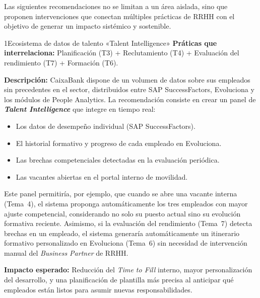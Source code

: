 Las siguientes recomendaciones no se limitan a un área aislada, sino que
proponen intervenciones que conectan múltiples prácticas de RRHH con el
objetivo de generar un impacto sistémico y sostenible.

\begin{recomendacion}{1}{Ecosistema de datos de talento «Talent Intelligence»}
\textbf{Práticas que interrelaciona:} Planificación (T3) + Reclutamiento (T4) + Evaluación del
rendimiento (T7) + Formación (T6).

\medskip
\textbf{Descripción:}
CaixaBank dispone de un volumen de datos sobre sus empleados sin precedentes
en el sector, distribuidos entre SAP SuccessFactors, Evoluciona y los módulos
de People Analytics. La recomendación consiste en crear un panel de
\textbf{\textit{Talent Intelligence}} que integre en tiempo real:
\begin{itemize}
  \item Los datos de desempeño individual (SAP SuccessFactors).
  \item El historial formativo y progreso de cada empleado en Evoluciona.
  \item Las brechas competenciales detectadas en la evaluación periódica.
  \item Las vacantes abiertas en el portal interno de movilidad.
\end{itemize}
Este panel permitiría, por ejemplo, que cuando se abre una vacante interna
(Tema~4), el sistema proponga automáticamente los tres empleados con mayor
ajuste competencial, considerando no solo su puesto actual sino su evolución
formativa reciente. Asimismo, si la evaluación del rendimiento (Tema~7)
detecta brechas en un empleado, el sistema generaría automáticamente un
itinerario formativo personalizado en Evoluciona (Tema~6) sin necesidad de
intervención manual del \textit{Business Partner} de RRHH.

\medskip
\textbf{Impacto esperado:}
Reducción del \textit{Time to Fill} interno, mayor personalización del
desarrollo, y una planificación de plantilla más precisa al anticipar qué
empleados están listos para asumir nuevas responsabilidades.
\end{recomendacion}


